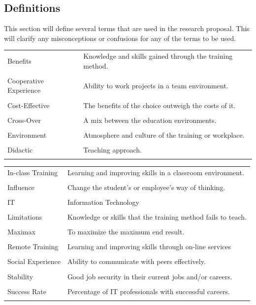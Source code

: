 \documentclass[titlepage]{article}
\begin{document}
\subsection{Definitions}
This section will define several terms that are used in the research proposal.  This will clarify
any misconceptions or confusions for any of the terms to be used.\\

\noindent \begin{tabularx}{\textwidth}{lX}
Benefits & Knowledge and skills gained through the training method.\\\\
Cooperative Experience & Ability to work projects in a team environment.\\\\
Cost-Effective & The benefits of the choice outweigh the costs of it.\\\\
Cross-Over & A mix between the education environments.\\\\
Environment & Atmosphere and culture of the training or workplace.\\\\
Didactic & Teaching approach.\\\\
\end{tabularx}

\noindent \begin{tabularx}{\textwidth}{lX}
In-class Training & Learning and improving skills in a classroom environment.\\\\
Influence & Change the student's or employee's way of thinking.\\\\
IT & Information Technology \\\\
Limitations & Knowledge or skills that the training method fails to teach.\\\\
Maximax & To maximize the maximum end result.\\\\
Remote Training & Learning and improving skills through on-line services\\\\
Social Experience & Ability to communicate with peers effectively.\\\\
Stability & Good job security in their current jobs and/or careers.\\\\
Success Rate & Percentage of IT professionals with successful careers.\\\\
\end{tabularx}
\end{document}
